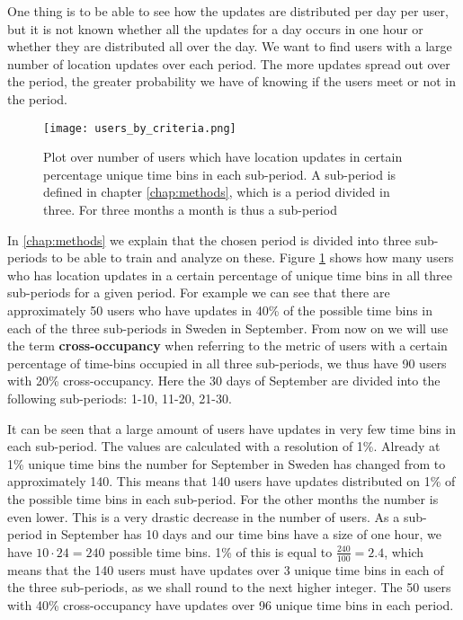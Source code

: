 One thing is to be able to see how the updates are distributed per day per user, but it is not known whether all the updates for a day occurs in one hour or whether they are distributed all over the day. We want to find users with a large number of location updates over each period. The more updates spread out over the period, the greater probability we have of knowing if the users meet or not in the period.


\begin{figure}[H]
    \hspace*{-2.0cm}
    \centering
    \texttt{[image: users\_by\_criteria.png]}
    \caption{Plot over number of users which have location updates in certain percentage unique time bins in each sub-period. A sub-period is defined in chapter \ref{chap:methods}, which is a period divided in three. For three months a month is thus a sub-period}
    \label{fig:users_by_criteria}
\end{figure}
In \autoref{chap:methods} we explain that the chosen period is divided into three sub-periods to be able to train and analyze on these. Figure \ref{fig:users_by_criteria} shows how many users who has location updates in a certain percentage of unique time bins in all three sub-periods for a given period. For example we can see that there are approximately 50 users who have updates in 40\% of the possible time bins in each of the three sub-periods in Sweden in September. From now on we will use the term \textbf{cross-occupancy} when referring to the metric of users with a certain percentage of time-bins occupied in all three sub-periods, we thus have 90 users with 20\% cross-occupancy. Here the 30 days of September are divided into the following sub-periods: 1-10, 11-20, 21-30. 

It can be seen that a large amount of users have updates in very few time bins in each sub-period. The values are calculated with a resolution of 1\%. Already at 1\% unique time bins the number for September in Sweden has changed from \numberUsersSweden{} to approximately 140. This means that 140 users have updates distributed on 1\% of the possible time bins in each sub-period. For the other months the number is even lower. This is a very drastic decrease in the number of users. 
As a sub-period in September has 10 days and our time bins have a size of one hour, we have $10\cdot24=240$ possible time bins. 1\% of this is equal to $\frac{240}{100}=2.4$, which means that the 140 users must have updates over 3 unique time bins in each of the three sub-periods, as we shall round to the next higher integer. 
The 50 users with 40\% cross-occupancy have updates over 96 unique time bins in each period.


